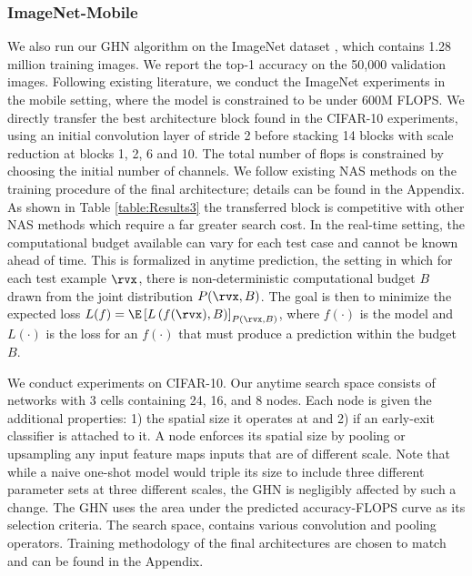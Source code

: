 \documentclass{article} %
\begin{document}
\subsubsection{ImageNet-Mobile}
We also run our GHN algorithm on the ImageNet dataset \citep{russakovsky2015imagenet}, which
contains 1.28 million training images. We report the top-1  accuracy on the 50,000 validation
images. Following existing literature, we conduct the ImageNet experiments in the mobile setting,
where the model is constrained to be under 600M FLOPS. We directly transfer the best architecture
block found in the CIFAR-10 experiments, using an initial convolution layer of stride 2 before
stacking 14 blocks with scale reduction at blocks 1, 2, 6 and 10. The total number of flops is
constrained by choosing the initial number of channels. We follow existing NAS methods on the
training procedure of the final architecture; details can be found in the Appendix. As shown in
Table \ref{table:Results3} the transferred block is competitive with other NAS methods which require
a far greater search cost.%
In the real-time setting, the computational budget available can vary for each test case and cannot
be known ahead of time. This is formalized in anytime prediction, \citep{grubb2012speedboost}  the
setting in which for each test example $\rvx$, there is non-deterministic computational budget $B$
drawn from the joint distribution $P(\rvx, B)$. The goal is then to minimize the expected loss $L(f)
= \E\left[ L\left( f(\rvx), B \right)\right]_{P(\rvx, B)}$, where $f(\cdot)$ is the model and
$L(\cdot)$ is the loss for an $f(\cdot)$ that must produce a prediction within the budget $B$.

We conduct experiments on CIFAR-10. Our anytime search space consists of networks with 3 cells
containing 24, 16, and 8 nodes. Each node is given the additional properties: 1) the spatial size it
operates at and 2) if an early-exit classifier is attached to it. A node enforces its spatial size
by pooling or upsampling any input feature maps inputs that are of different scale. Note that while
a naive one-shot model would triple its size to include three different parameter sets at three
different scales, the GHN is negligibly affected by such a change. The GHN uses the area under the
predicted accuracy-FLOPS curve as its selection criteria. The search space, contains various
convolution and pooling operators. Training methodology of the final architectures are chosen to
match \cite{huang2017multi} and can be found in the Appendix.
\end{document}
